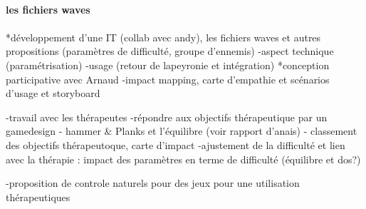 \paragraph{les fichiers waves}

\paragraph{}
	*développement d'une IT (collab avec andy), les fichiers waves et autres propositions (paramètres de difficulté, groupe d'ennemis)
		-aspect technique (paramétrisation) 
		-usage (retour de lapeyronie et intégration)
	*conception participative avec Arnaud 
		-impact mapping, carte d'empathie et scénarios d'usage et storyboard
	
	-travail avec les thérapeutes
	-répondre aux objectifs thérapeutique par un gamedesign
		- hammer \& Planks et l'équilibre (voir rapport d'anais)
		- classement des objectifs thérapeutoque, carte d'impact
	-ajustement de la difficulté et lien avec la thérapie : impact des paramètres en terme de difficulté (équilibre et dos?)
	
	-proposition de controle naturels pour des jeux pour une utilisation thérapeutiques